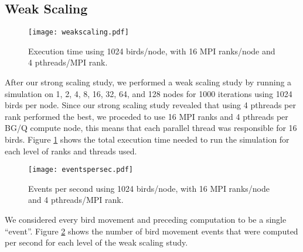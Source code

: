 \subsection*{Weak Scaling}
\FloatBarrier
\begin{figure}[h!]
  \centering
  \texttt{[image: weakscaling.pdf]}
  \caption{Execution time using 1024 birds/node, with 16 MPI ranks/node and 4 pthreads/MPI rank.\label{fig:weakscaling}}
\end{figure}

After our strong scaling study, we performed a weak scaling study by running a
simulation on 1, 2, 4, 8, 16, 32, 64, and 128 nodes for 1000 iterations using
1024 birds per node. Since our strong scaling study revealed that using 4 pthreads
per rank performed the best, we proceded to use 16 MPI ranks and 4 pthreads per
BG/Q compute node, this means that each parallel thread was responsible for 16
birds. Figure \ref{fig:weakscaling} shows the total execution time
needed to run the simulation for each level of ranks and threads used.

\begin{figure}[h!]
  \centering
  \texttt{[image: eventspersec.pdf]}
  \caption{Events per second using 1024 birds/node, with 16 MPI ranks/node and 4 pthreads/MPI rank.\label{fig:eventspersec}}
\end{figure}

We considered every bird movement and preceding computation to be a single ``event''.
Figure \ref{fig:eventspersec} shows the number of bird movement events that were
computed per second for each level of the weak scaling study.
